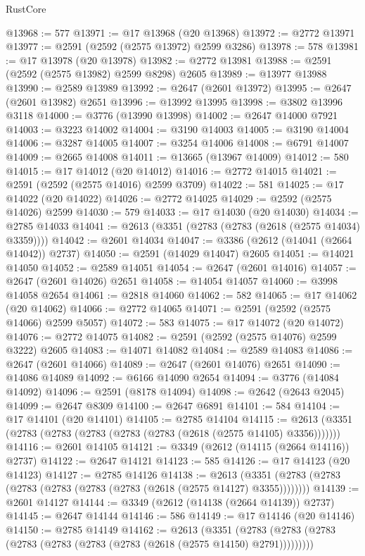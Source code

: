 \begin{lexlean}{RustCore}
\begin{coremodule}
@13968 := 577
@13971 := @17 @13968 (@20 @13968)
@13972 := @2772 @13971
@13977 := @2591 (@2592 (@2575 @13972) @2599 @3286)
@13978 := 578
@13981 := @17 @13978 (@20 @13978)
@13982 := @2772 @13981
@13988 := @2591 (@2592 (@2575 @13982) @2599 @8298) @2605
@13989 := @13977 @13988
@13990 := @2589 @13989
@13992 := @2647 (@2601 @13972)
@13995 := @2647 (@2601 @13982) @2651
@13996 := @13992 @13995
@13998 := @3802 @13996 @3118
@14000 := @3776 (@13990 @13998)
@14002 := @2647 @14000 @7921
@14003 := @3223 @14002
@14004 := @3190 @14003
@14005 := @3190 @14004
@14006 := @3287 @14005
@14007 := @3254 @14006
@14008 := @6791 @14007
@14009 := @2665 @14008
@14011 := @13665 (@13967 @14009)
@14012 := 580
@14015 := @17 @14012 (@20 @14012)
@14016 := @2772 @14015
@14021 := @2591 (@2592 (@2575 @14016) @2599 @3709)
@14022 := 581
@14025 := @17 @14022 (@20 @14022)
@14026 := @2772 @14025
@14029 := @2592 (@2575 @14026) @2599
@14030 := 579
@14033 := @17 @14030 (@20 @14030)
@14034 := @2785 @14033
@14041 := @2613 (@3351 (@2783 (@2783 (@2618 (@2575 @14034) @3359))))
@14042 := @2601 @14034
@14047 := @3386 (@2612 (@14041 (@2664 @14042)) @2737)
@14050 := @2591 (@14029 @14047) @2605
@14051 := @14021 @14050
@14052 := @2589 @14051
@14054 := @2647 (@2601 @14016)
@14057 := @2647 (@2601 @14026) @2651
@14058 := @14054 @14057
@14060 := @3998 @14058 @2654
@14061 := @2818 @14060
@14062 := 582
@14065 := @17 @14062 (@20 @14062)
@14066 := @2772 @14065
@14071 := @2591 (@2592 (@2575 @14066) @2599 @5057)
@14072 := 583
@14075 := @17 @14072 (@20 @14072)
@14076 := @2772 @14075
@14082 := @2591 (@2592 (@2575 @14076) @2599 @3222) @2605
@14083 := @14071 @14082
@14084 := @2589 @14083
@14086 := @2647 (@2601 @14066)
@14089 := @2647 (@2601 @14076) @2651
@14090 := @14086 @14089
@14092 := @6166 @14090 @2654
@14094 := @3776 (@14084 @14092)
@14096 := @2591 (@8178 @14094)
@14098 := @2642 (@2643 @2045)
@14099 := @2647 @8309
@14100 := @2647 @6891
@14101 := 584
@14104 := @17 @14101 (@20 @14101)
@14105 := @2785 @14104
@14115 := @2613 (@3351 (@2783 (@2783 (@2783 (@2783 (@2783 (@2618 (@2575 @14105) @3356)))))))
@14116 := @2601 @14105
@14121 := @3349 (@2612 (@14115 (@2664 @14116)) @2737)
@14122 := @2647 @14121
@14123 := 585
@14126 := @17 @14123 (@20 @14123)
@14127 := @2785 @14126
@14138 := @2613 (@3351 (@2783 (@2783 (@2783 (@2783 (@2783 (@2783 (@2618 (@2575 @14127) @3355))))))))
@14139 := @2601 @14127
@14144 := @3349 (@2612 (@14138 (@2664 @14139)) @2737)
@14145 := @2647 @14144
@14146 := 586
@14149 := @17 @14146 (@20 @14146)
@14150 := @2785 @14149
@14162 := @2613
    (@3351 (@2783 (@2783 (@2783 (@2783 (@2783 (@2783 (@2783 (@2618 (@2575 @14150) @2791)))))))))

\end{coremodule}
\end{lexlean}
